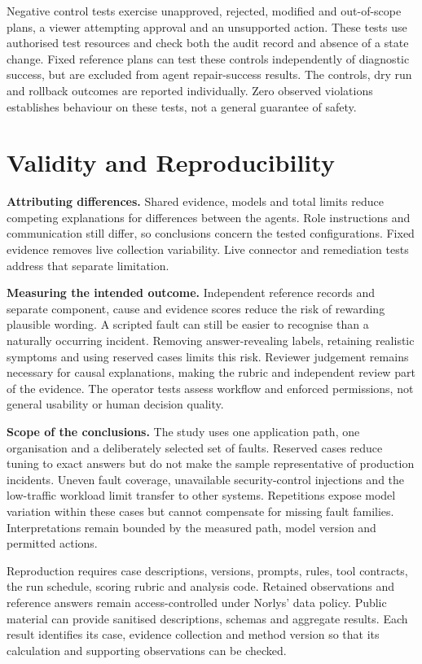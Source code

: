 Negative control tests exercise unapproved, rejected, modified and
out-of-scope plans, a viewer attempting approval and an unsupported action.
These tests use authorised test resources and check both the audit record
and absence of a state change. Fixed reference plans can test these
controls independently of diagnostic success, but are excluded from
agent repair-success results. The controls, dry run and rollback outcomes
are reported individually. Zero observed violations establishes behaviour
on these tests, not a general guarantee of safety.

\section{Validity and Reproducibility}
\label{sec:methodology:validity}

\noindent\textbf{Attributing differences.}
Shared evidence, models and total limits reduce competing explanations
for differences between the agents. Role instructions and communication
still differ, so conclusions concern the tested configurations. Fixed
evidence removes live collection variability. Live connector and
remediation tests address that separate limitation.

\noindent\textbf{Measuring the intended outcome.}
Independent reference records and separate component, cause and evidence
scores reduce the risk of rewarding plausible wording. A scripted fault
can still be easier to recognise than a naturally occurring incident.
Removing answer-revealing labels, retaining realistic symptoms and using
reserved cases limits this risk. Reviewer judgement remains necessary
for causal explanations, making the rubric and independent review part
of the evidence. The operator tests assess workflow and enforced
permissions, not general usability or human decision quality.

\noindent\textbf{Scope of the conclusions.}
The study uses one application path, one organisation and a deliberately
selected set of faults. Reserved cases reduce tuning to exact answers
but do not make the sample representative of production incidents.
Uneven fault coverage, unavailable security-control injections and the
low-traffic workload limit transfer to other systems. Repetitions expose
model variation within these cases but cannot compensate for missing
fault families. Interpretations remain bounded by the measured path,
model version and permitted actions.

Reproduction requires case descriptions, versions, prompts, rules, tool
contracts, the run schedule, scoring rubric and analysis code. Retained
observations and reference answers remain access-controlled under Norlys'
data policy. Public material can provide sanitised descriptions, schemas
and aggregate results. Each result identifies its case, evidence collection
and method version so that its calculation and supporting observations
can be checked.
